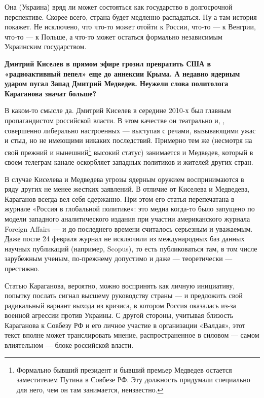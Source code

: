 \begin{fancyquotes}
    Она (Украина) вряд ли может состояться как государство в долгосрочной перспективе. Скорее всего, страна будет медленно распадаться. Ну а там история покажет. Не исключено, что что-то может отойти к России, что-то — к Венгрии, что-то — к Польше, а что-то может остаться формально независимым Украинским государством.
\end{fancyquotes}

\textbf{Дмитрий Киселев в прямом эфире грозил превратить США в «радиоактивный пепел» еще до аннексии Крыма. А недавно ядерным ударом пугал Запад Дмитрий Медведев. Неужели слова политолога Караганова значат больше?}

В каком-то смысле да. Дмитрий Киселев в середине 2010-х был главным пропагандистом российской власти. В этом качестве он театрально и, , совершенно   либерально настроенных  --- выступая с речами, вызывающими ужас и стыд, но не имеющими никаких последствий. Примерно тем же (несмотря на свой прежний и нынешний\footnote{Формально бывший президент и бывший премьер Медведев остается заместителем Путина в Совбезе РФ. Эту должность придумали специально для него, чем он там занимается, неизвестно.} высокий статус) занимается и Медведев, который в своем телеграм-канале оскорбляет западных политиков и жителей других стран.

В случае Киселева и Медведева угрозы ядерным оружием воспринимаются в ряду других не менее жестких заявлений. В отличие от Киселева и Медведева, Караганов всегда вел себя сдержанно. При этом его статья перепечатана в журнале «Россия в глобальной политике»: это медиа когда-то было запущено по модели западного аналитического издания при участии американского журнала Foreign Affairs — и до последнего времени считалось серьезным и уважаемым. Даже после 24 февраля журнал не исключили из международных баз данных научных публикаций (например, Scopus), то есть публиковаться там, в том числе зарубежным ученым, по-прежнему допустимо и даже — теоретически — престижно.

Статью Караганова, вероятно, можно воспринять как личную инициативу, попытку послать сигнал высшему руководству страны — и предложить свой радикальный вариант выхода из кризиса, в котором Россия оказалась из-за военной агрессии против Украины. С другой стороны, учитывая близость Караганова к Совбезу РФ и его личное участие в организации «Валдая», этот текст вполне может транслировать мнение, распространенное в силовом — самом влиятельном — блоке российской власти.

